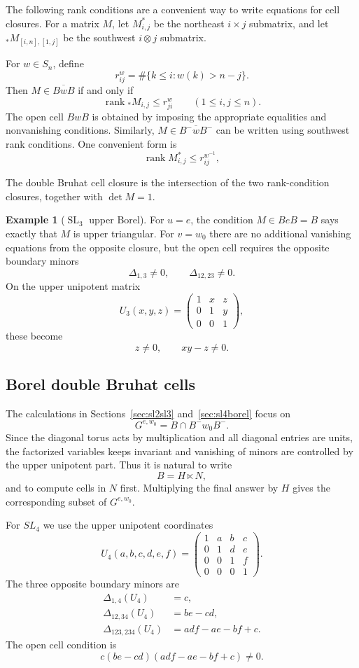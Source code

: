 \documentclass[12pt]{amsart}
\newcommand{\SL}{\operatorname{SL}}
\newcommand{\rank}{\operatorname{rank}}
\newcommand{\ol}{\overline}
\theoremstyle{plain}
\theoremstyle{definition}
\newtheorem{example}[theorem]{Example}
\theoremstyle{remark}
\begin{document}
The following rank conditions are a convenient way to write equations for cell closures.  For a matrix $M$, let $M^*_{i,j}$ be the northeast $i\times j$ submatrix, and let ${}_* M_{[i,n],[1,j]}$ be the southwest $i\otimes j$ submatrix.

For $w\in S_n$, define
\[
   r^w_{ij}=\#\{k\leq i: w(k)> n-j
\}.
\]
Then $M\in \ol{BwB}$ if and only if
\[
   \rank {}_* M_{i,j}\leq r^w_{ji}
   \qquad (1\leq i,j\leq n).
\]
The open cell $BwB$ is obtained by imposing the appropriate equalities and nonvanishing conditions.  Similarly, $M\in\ol{B^-wB^-}$ can be written using southwest rank conditions.  One convenient form is
\[
   \rank M_{i,j}^*\leq r^{w^{-1}}_{ij},
\]

The double Bruhat cell closure is the intersection of the two rank-condition closures, together with $\det M=1$.

\begin{example}[$\SL_3$ upper Borel]
For $u=e$, the condition $M\in BeB=B$ says exactly that $M$ is upper triangular.  For $v=w_0$ there are no additional vanishing equations from the opposite closure, but the open cell requires the opposite boundary minors
\[
   \Delta_{1,3}\neq0,
   \qquad
   \Delta_{12,23}\neq0.
\]
On the upper unipotent matrix
\[
   U_3(x,y,z)=
   \begin{pmatrix}
   1&x&z\\
   0&1&y\\
   0&0&1
   \end{pmatrix},
\]
these become
\[
   z\neq0,
   \qquad
   xy-z\neq0.
\]
\end{example}

\subsection{Borel double Bruhat cells}

The calculations in Sections~\ref{sec:sl2sl3} and~\ref{sec:sl4borel} focus on
\[
   G^{e,w_0}=B\cap B^-w_0B^-.
\]
Since the diagonal torus acts by multiplication and all diagonal entries are units, the factorized variables keeps invariant and vanishing of minors are controlled by the upper unipotent part.  Thus it is natural to write
\[
   B=H\ltimes N,
\]
and to compute cells in $N$ first.  Multiplying the final answer by $H$ gives the corresponding subset of $G^{e,w_0}$.

For $SL_4$ we use the upper unipotent coordinates
\[
U_4(a,b,c,d,e,f)=
\begin{pmatrix}
1&a&b&c\\
0&1&d&e\\
0&0&1&f\\
0&0&0&1
\end{pmatrix}.
\]
The three opposite boundary minors are
\begin{align*}
   \Delta_{1,4}(U_4)&=c,\\
   \Delta_{12,34}(U_4)&=be-cd,\\
   \Delta_{123,234}(U_4)&=adf-ae-bf+c.
\end{align*}
The open cell condition is
\[
   c(be-cd)(adf-ae-bf+c)\neq0.
\]
\end{document}
